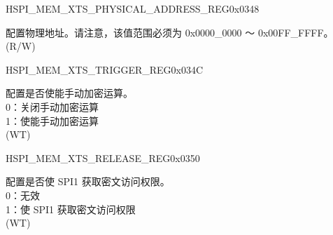 \begin{register}{H}{SPI\_MEM\_XTS\_PHYSICAL\_ADDRESS\_REG}{0x0348}\label{regdesc:SPIMEMXTSPHYSICALADDRESSREG}
%
%
\regnewline%
\begin{regdesc}\begin{reglist}
\label{fielddesc:SPIMEMXTSPHYSICALADDRESS}\item [SPI\_MEM\_XTS\_PHYSICAL\_ADDRESS] 配置物理地址。请注意，该值范围必须为 0x0000\_0000 ～ 0x00FF\_FFFF。(R/W)
\end{reglist}\end{regdesc}
\end{register}


\begin{register}{H}{SPI\_MEM\_XTS\_TRIGGER\_REG}{0x034C}\label{regdesc:SPIMEMXTSTRIGGERREG}
%
%
\regnewline%
\begin{regdesc}\begin{reglist}
\label{fielddesc:SPIMEMXTSTRIGGER}\item [SPI\_MEM\_XTS\_TRIGGER] 配置是否使能手动加密运算。\\
0：关闭手动加密运算\\
1：使能手动加密运算\\
(WT)
\end{reglist}\end{regdesc}
\end{register}


\begin{register}{H}{SPI\_MEM\_XTS\_RELEASE\_REG}{0x0350}\label{regdesc:SPIMEMXTSRELEASEREG}
%
%
\regnewline%
\begin{regdesc}\begin{reglist}
\label{fielddesc:SPIMEMXTSRELEASE}\item [SPI\_MEM\_XTS\_RELEASE] 配置是否使 SPI1 获取密文访问权限。\\
0：无效\\
1：使 SPI1 获取密文访问权限\\
(WT)
\end{reglist}\end{regdesc}
\end{register}


